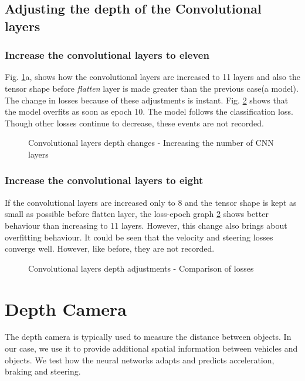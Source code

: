 \subsection{Adjusting the depth of the Convolutional layers}
\subsubsection*{Increase the convolutional layers to eleven}
Fig. \ref{fig:convlayerschange2}a, shows how the convolutional layers are increased to 11
layers and also the tensor shape before \textit{flatten} layer is made greater than the
previous case(a model). The change in losses because of these adjustments is instant.
Fig. \ref{fig:convlayerslosses2} shows that the model overfits as soon as epoch 10. The
model follows the classification loss. Though other losses continue to decrease, these
events are not recorded.
\begin{figure}[!ht]
    \def\svgwidth{\textwidth}
    \caption{Convolutional layers depth changes - Increasing the number of CNN layers}
    \label{fig:convlayerschange2}
\end{figure}
\subsubsection*{Increase the convolutional layers to eight}
If the convolutional layers are increased only to 8 and the tensor shape is kept as small
as possible before flatten layer, the loss-epoch graph \ref{fig:convlayerslosses2} shows
better behaviour than increasing to 11 layers. However, this change also brings about
overfitting behaviour. It could be seen that the velocity and steering losses converge
well. However, like before, they are not recorded.
\begin{figure}[!ht]
    \centering
    \def\svgwidth{\textwidth}
    \caption{Convolutional layers depth adjustments - Comparison of losses}
    \label{fig:convlayerslosses2}
\end{figure}
\section{Depth Camera}
The depth camera is typically used to measure the distance between objects. In our case,
we use it to provide additional spatial information between vehicles and objects. We test
how the neural networks adapts and predicts acceleration, braking and steering.

